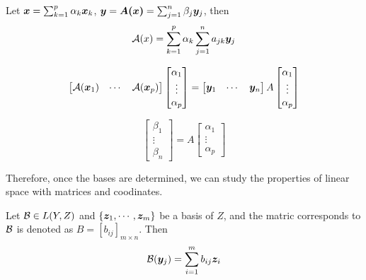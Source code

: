         Let $\boldsymbol{x} = \sum_{k=1}^p \alpha_k \boldsymbol{x}_k$, $\boldsymbol{y} = \boldsymbol{A(x)} = \sum_{j=1}^n \beta_j \boldsymbol{y}_j$, then
        \begin{equation}
            \mathcal{A}(x) = \sum_{k=1}^p \alpha_k \sum_{j=1}^n a_{jk}\boldsymbol{y}_j
        \end{equation}
        
        \begin{equation}
            \begin{bmatrix}
                \mathcal{A}(\boldsymbol{x}_1) & \cdots & \mathcal{A}(\boldsymbol{x}_p)
            \end{bmatrix}
            \begin{bmatrix}
                \alpha_1 \\ \vdots \\ \alpha_p
            \end{bmatrix}
            = 
            \begin{bmatrix}
                \boldsymbol{y}_1 & \cdots & \boldsymbol{y}_n
            \end{bmatrix}
            A
            \begin{bmatrix}
                \alpha_1 \\ \vdots \\ \alpha_p
            \end{bmatrix}
        \end{equation}

        \begin{equation}
            \begin{bmatrix}
                \beta_1 \\ \vdots \\ \beta_n
            \end{bmatrix}
            = A
            \begin{bmatrix}
                \alpha_1 \\ \vdots \\ \alpha_p
            \end{bmatrix}
        \end{equation}

        Therefore, once the bases are determined, we can study the properties of linear space with matrices and coodinates.

        Let $\mathcal{B} \in L(Y,Z)$ and $\{ \boldsymbol{z}_1,\cdots, \boldsymbol{z}_m \}$ be a basis of $Z$, and the matric corresponds to $\mathcal{B}$ is denoted as $B = [b_{ij}]_{m \times n}$. Then
        \begin{equation}
            \mathcal{B}(\boldsymbol{y}_j) = \sum_{i=1}^m b_{ij}\boldsymbol{z}_i
        \end{equation}


